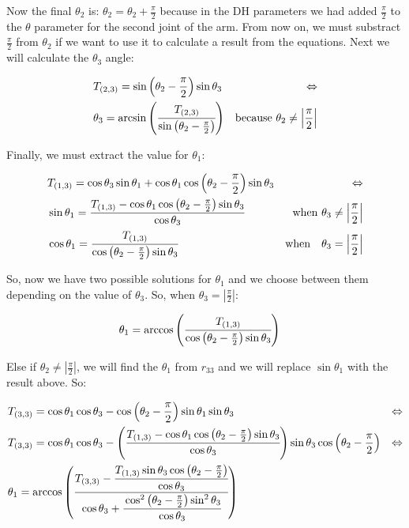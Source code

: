 Now the final $\theta_2$ is: $\theta_2 = \theta_2 + \frac{\pi}{2}$ because in the DH parameters we had added $\frac{\pi}{2}$ to the $\theta$ parameter for the second joint of the arm. From now on, we must substract $\frac{\pi}{2}$ from $\theta_2$ if we want to use it to calculate a result from the equations. Next we will calculate the $\theta_3$ angle:
\begin{small}
\begin{align*}
&T_{(2,3)} = \sin\left(\theta_2 - \frac{\pi}{2}\right)\sin\theta_3 &\Leftrightarrow \\
& \theta_3 = \arcsin\left( \cfrac{ T_{(2,3)} }{ \sin\left(\theta_2-\frac{\pi}{2}\right)}\right)  &\text{because }    \theta_2 \neq \left|\frac{\pi}{2}\right|
\end{align*}
\end{small}
Finally, we must extract the value for $\theta_1$:
\begin{small}
\begin{align*}
&T_{(1,3)} = \cos\theta_3\sin\theta_1 + \cos\theta_1\cos\left(\theta_2 - \frac{\pi}{2}\right)\sin\theta_3 &\Leftrightarrow \\
&\sin\theta_1 = \cfrac{T_{(1,3)} - \cos\theta_1\cos\left(\theta_2 - \frac{\pi}{2}\right)\sin\theta_3}{\cos\theta_3}  &\text{when } \theta_3 \neq \left|\frac{\pi}{2}\right|\\
&\cos\theta_1 = \cfrac{T_{(1,3)}}{\cos\left(\theta_2 - \frac{\pi}{2}\right)\sin\theta_3}  &\text{when} \quad \theta_3 = \left|\frac{\pi}{2}\right|
\end{align*}
\end{small}
So, now we have two possible solutions for $\theta_1$ and we choose between them depending on the value of $\theta_3$. So, when $\theta_3 = \left|\frac{\pi}{2}\right|$:
\begin{small}
\begin{align*}
&\theta_1 = \arccos\left(\cfrac{T_{(1,3)}}{\cos\left(\theta_2 - \frac{\pi}{2}\right)\sin\theta_3}\right)
\end{align*}
\end{small}
Else if $\theta_2 \neq \left|\frac{\pi}{2}\right|$, we will find the $\theta_1$ from $r_{33}$ and we will replace $\sin\theta_1$ with the result above. So:
\begin{small}
\begin{align*}
&T_{(3,3)} = \cos\theta_1\cos\theta_3 - \cos\left(\theta_2 - \frac{\pi}{2}\right)\sin\theta_1\sin\theta_3 &\Leftrightarrow \\
&T_{(3,3)} = \cos\theta_1\cos\theta_3 - \left(\cfrac{T_{(1,3)} - \cos\theta_1\cos\left(\theta_2 - \frac{\pi}{2}\right)\sin\theta_3}{\cos\theta_3}\right)\sin\theta_3\cos\left(\theta_2 - \frac{\pi}{2}\right) &\Leftrightarrow \\
&\theta_1 = \arccos\left(\cfrac{T_{(3,3)} -\cfrac{ T_{(1,3)}\sin\theta_3\cos\left(\theta_2 - \frac{\pi}{2}\right)}{\cos\theta_3}}{\cos\theta_3 + \cfrac{\cos^2\left(\theta_2-\frac{\pi}{2}\right)\sin^2\theta_3}{\cos\theta_3}}\right)
\end{align*}
\end{small}
